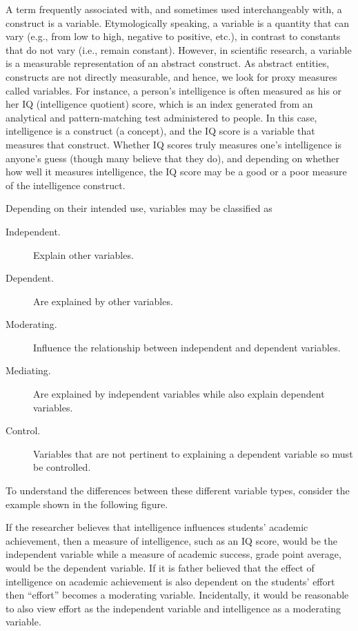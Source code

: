 A term frequently associated with, and sometimes used interchangeably with, a construct is a \gls{variable}. Etymologically speaking, a variable is a quantity that can vary (e.g., from low to high, negative to positive, etc.), in contrast to constants that do not vary (i.e., remain constant). However, in scientific research, a variable is a measurable representation of an abstract construct. As abstract entities, constructs are not directly measurable, and hence, we look for proxy measures called variables. For instance, a person’s intelligence is often measured as his or her IQ (intelligence quotient) score, which is an index generated from an analytical and pattern-matching test administered to people. In this case, intelligence is a construct (a concept), and the IQ score is a variable that measures that construct. Whether IQ scores truly measures one’s intelligence is anyone’s guess (though many believe that they do), and depending on whether how well it measures intelligence, the IQ score may be a good or a poor measure of the intelligence construct. 

Depending on their intended use, variables may be classified as 

\begin{description}
	\item[Independent.] Explain other variables.
	\item[Dependent.] Are explained by other variables.
	\item[Moderating.] Influence the relationship between independent and dependent variables.
	\item[Mediating.] Are explained by independent variables while also explain dependent variables.
	\item[Control.] Variables that are not pertinent to explaining a dependent variable so must be controlled.
\end{description}

To understand the differences between these different variable types, consider the example shown in the following figure. 


If the researcher believes that intelligence influences students' academic achievement, then a measure of intelligence, such as an IQ score, would be the independent variable while a measure of academic success, grade point average, would be the dependent variable. If it is father believed that the effect of intelligence on academic achievement is also dependent on the students' effort then ``effort'' becomes a moderating variable. Incidentally, it would be reasonable to also view effort as the independent variable and intelligence as a moderating variable.  

